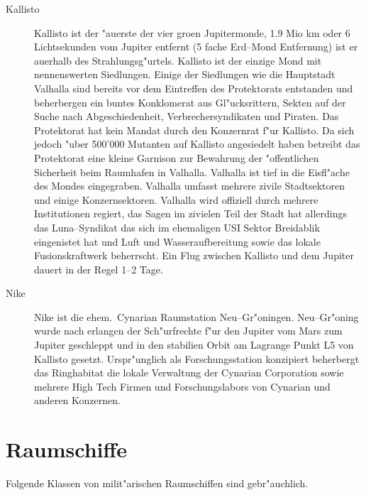 \begin{appendices}
\begin{description}
\item [Kallisto] Kallisto ist der "au\3erste der vier gro\3en Jupitermonde, 1.9 Mio km oder 6 Lichtsekunden vom Jupiter
      entfernt (5 fache Erd--Mond Entfernung) ist er au\3erhalb des Strahlungsg"urtels. Kallisto ist der einzige Mond mit nennenswerten Siedlungen. Einige der Siedlungen wie die Hauptstadt Valhalla sind bereits vor dem Eintreffen des Protektorats entstanden und beherbergen ein buntes Konklomerat aus Gl"ucksrittern, Sekten auf der Suche nach Abgeschiedenheit, Verbrechersyndikaten und Piraten. Das Protektorat hat kein Mandat durch den Konzernrat f"ur Kallisto. Da sich jedoch "uber 500'000 Mutanten auf Kallisto angesiedelt haben betreibt das Protektorat eine kleine Garnison zur Bewahrung der "offentlichen Sicherheit beim Raumhafen in Valhalla. Valhalla ist tief in die Eisfl"ache des Mondes eingegraben. Valhalla umfasst mehrere zivile Stadtsektoren und einige Konzernsektoren. Valhalla wird offiziell durch mehrere Institutionen regiert, das Sagen im zivielen Teil der Stadt hat allerdings das Luna--Syndikat das sich im ehemaligen USI Sektor Breidablik eingenistet hat und Luft und Wasseraufbereitung sowie das lokale Fusionskraftwerk beherrscht. Ein Flug zwischen Kallisto und dem Jupiter dauert in der Regel 1--2 Tage. %
\item [Nike] Nike ist die ehem.~Cynarian Raumstation Neu--Gr"oningen. Neu--Gr"oning wurde nach erlangen der
      Sch"urfrechte f"ur den Jupiter vom Mars zum Jupiter geschleppt und in den stabilien Orbit am Lagrange Punkt L5 von Kallisto gesetzt. Urspr"unglich als Forschungsstation konzipiert beherbergt das Ringhabitat die lokale Verwaltung der Cynarian Corporation sowie mehrere High Tech Firmen und Forschungslabors von Cynarian und anderen Konzernen.
\end{description}

\section{Raumschiffe}

Folgende Klassen von milit"arischen Raumschiffen sind gebr"auchlich.


\end{appendices}
